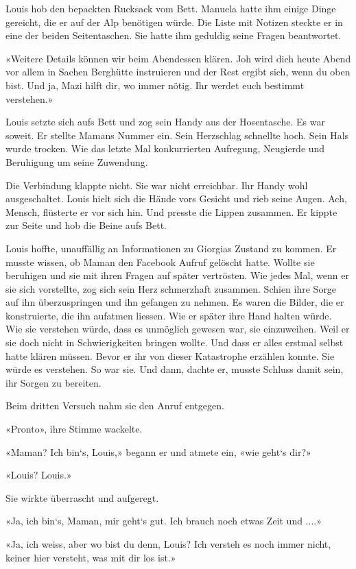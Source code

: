 Louis hob den bepackten Rucksack vom Bett. Manuela hatte ihm einige
Dinge gereicht, die er auf der Alp benötigen würde. Die Liste mit
Notizen steckte er in eine der beiden Seitentaschen. Sie hatte ihm
geduldig seine Fragen beantwortet.

«Weitere Details können wir beim Abendessen klären. Joh wird dich heute
Abend vor allem in Sachen Berghütte instruieren und der Rest ergibt
sich, wenn du oben bist. Und ja, Mazi hilft dir, wo immer nötig. Ihr
werdet euch bestimmt verstehen.»

Louis setzte sich aufs Bett und zog sein Handy aus der Hosentasche. Es
war soweit. Er stellte Mamans Nummer ein. Sein Herzschlag schnellte
hoch. Sein Hals wurde trocken. Wie das letzte Mal konkurrierten
Aufregung, Neugierde und Beruhigung um seine Zuwendung.

Die Verbindung klappte nicht. Sie war nicht erreichbar. Ihr Handy wohl
ausgeschaltet. Louis hielt sich die Hände vors Gesicht und rieb seine
Augen. Ach, Mensch, flüsterte er vor sich hin. Und presste die Lippen
zusammen. Er kippte zur Seite und hob die Beine aufs Bett.

Louis hoffte, unauffällig an Informationen zu Giorgias Zustand zu
kommen. Er musste wissen, ob Maman den Facebook Aufruf gelöscht hatte.
Wollte sie beruhigen und sie mit ihren Fragen auf später vertrösten. Wie
jedes Mal, wenn er sie sich vorstellte, zog sich sein Herz schmerzhaft
zusammen. Schien ihre Sorge auf ihn überzuspringen und ihn gefangen zu
nehmen. Es waren die Bilder, die er konstruierte, die ihn aufatmen
liessen. Wie er später ihre Hand halten würde. Wie sie verstehen würde,
dass es unmöglich gewesen war, sie einzuweihen. Weil er sie doch nicht
in Schwierigkeiten bringen wollte. Und dass er alles erstmal selbst
hatte klären müssen. Bevor er ihr von dieser Katastrophe erzählen
konnte. Sie würde es verstehen. So war sie. Und dann, dachte er, musste
Schluss damit sein, ihr Sorgen zu bereiten.

Beim dritten Versuch nahm sie den Anruf entgegen.

«Pronto», ihre Stimme wackelte.

«Maman? Ich bin`s, Louis,» begann er und atmete ein, «wie geht`s dir?»

«Louis? Louis.»

Sie wirkte überrascht und aufgeregt.

«Ja, ich bin`s, Maman, mir geht`s gut. Ich brauch noch etwas Zeit und
....»

«Ja, ich weiss, aber wo bist du denn, Louis? Ich versteh es noch immer
nicht, keiner hier versteht, was mit dir los ist.»


